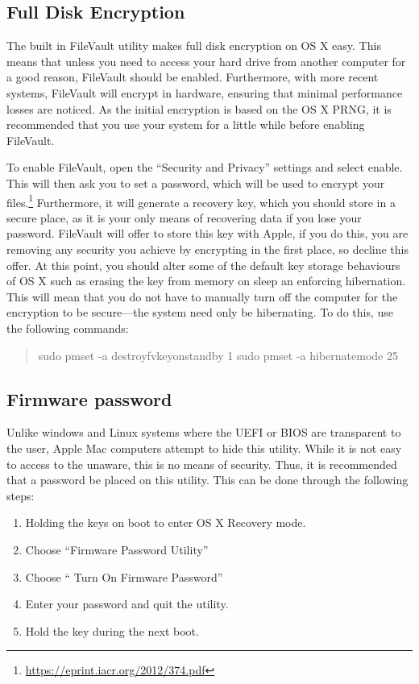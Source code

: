 \documentclass[a4paper,11pt]{report}
\begin{document}
		\subsection{Full Disk Encryption}
			The built in FileVault utility makes full disk encryption on OS X easy. 
			This means that unless you need to access your hard drive from another computer for a good reason, FileVault should be enabled. 
			Furthermore, with more recent systems, FileVault will encrypt in hardware, ensuring that minimal performance losses are noticed. 
			As the initial encryption is based on the OS X PRNG, it is recommended that you use your system for a little while before enabling FileVault. 

			To enable FileVault, open the ``Security and Privacy'' settings and select enable. 
			This will then ask you to set a password, which will be used to encrypt your files.\footnote{\url{https://eprint.iacr.org/2012/374.pdf}} 
			Furthermore, it will generate a recovery key, which you should store in a secure place, as it is your only means of recovering data if you lose your password. 
			FileVault will offer to store this key with Apple, if you do this, you are removing any security you achieve by encrypting in the first place, so decline this offer. 
			At this point, you should alter some of the default key storage behaviours of OS X such as erasing the key from memory on sleep an enforcing hibernation. 
			This will mean that you do not have to manually turn off the computer for the encryption to be secure---the system need only be hibernating. 
			To do this, use the following commands:
			\begin{quote}
				sudo pmset -a destroyfvkeyonstandby 1
				sudo pmset -a hibernatemode 25
			\end{quote}
		\subsection{Firmware password}
			Unlike windows and Linux systems where the UEFI or BIOS are transparent to the user, Apple Mac computers attempt to hide this utility. 
			While it is not easy to access to the unaware, this is no means of security. 
			Thus, it is recommended that a password be placed on this utility. 
			This can be done through the following steps:
			\begin{enumerate}
				\item Holding the keys  on boot to enter OS X Recovery mode.
				\item Choose ``Firmware Password Utility''
				\item Choose `` Turn On Firmware Password''
				\item Enter your password and quit the utility. 
				\item Hold the \Alt{} key during the next boot.
			\end{enumerate}
\end{document}
